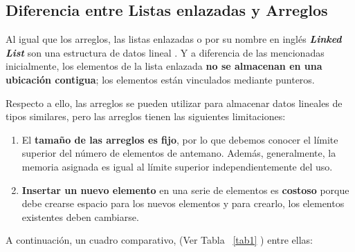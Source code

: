\documentclass[10pt,journal]{IEEEtran}
\begin{document}
    \subsection{\textbf{Diferencia entre Listas enlazadas y Arreglos}}
    Al igual que los arreglos, las listas enlazadas o por su nombre en inglés \textit{\textbf{Linked List}} son una estructura de datos lineal \cite{LinkedLi27:online}. Y a diferencia de las mencionadas inicialmente, los elementos de la lista enlazada \textbf{no se almacenan en una ubicación contigua}; los elementos están vinculados mediante punteros.
    
    Respecto a ello, las arreglos se pueden utilizar para almacenar datos lineales de tipos similares, pero las arreglos tienen las siguientes limitaciones:
    \begin{enumerate}
        \item El \textbf{tamaño de las arreglos es fijo}, por lo que debemos conocer el límite superior del número de elementos de antemano. Además, generalmente, la memoria asignada es igual al límite superior independientemente del uso. 
        \item \textbf{Insertar un nuevo elemento} en una serie de elementos es \textbf{costoso} porque debe crearse espacio para los nuevos elementos y para crearlo, los elementos existentes deben cambiarse. 
    \end{enumerate}
    
    A continuación, un cuadro comparativo, (Ver Tabla ~\ref{tab1} ) entre ellas:
\end{document}
